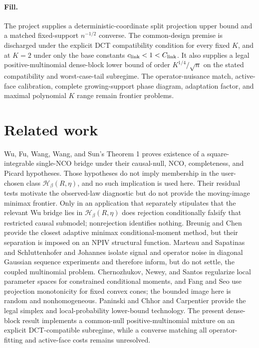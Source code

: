 \documentclass{article}
\begin{document}
\paragraph{Fill.} The project supplies a deterministic-coordinate split projection upper bound and a matched fixed-support \(n^{-1/2}\) converse. The common-design premise is discharged under the explicit DCT compatibility condition for every fixed \(K\), and at \(K=2\) under only the base constants \(c_{\rm link}<1<C_{\rm link}\). It also supplies a legal positive-multinomial dense-block lower bound of order \(K^{1/4}/\sqrt n\) on the stated compatibility and worst-case-tail subregime. The operator-nuisance match, active-face calibration, complete growing-support phase diagram, adaptation factor, and maximal polynomial \(K\) range remain frontier problems.

\section{Related work}

Wu, Fu, Wang, Wang, and Sun's Theorem 1 proves existence of a square-integrable single-NCO bridge under their causal-null, NCO, completeness, and Picard hypotheses. Those hypotheses do not imply membership in the user-chosen class \(\mathcal H_\beta(R,\eta)\), and no such implication is used here. Their residual tests motivate the observed-law diagnostic but do not provide the moving-image minimax frontier. Only in an application that separately stipulates that the relevant Wu bridge lies in \(\mathcal H_\beta(R,\eta)\) does rejection conditionally falsify that restricted causal submodel; nonrejection identifies nothing. Breunig and Chen provide the closest adaptive minimax conditional-moment method, but their separation is imposed on an NPIV structural function. Marteau and Sapatinas and Schluttenhofer and Johannes isolate signal and operator noise in diagonal Gaussian sequence experiments and therefore inform, but do not settle, the coupled multinomial problem. Chernozhukov, Newey, and Santos regularize local parameter spaces for constrained conditional moments, and Fang and Seo use projection monotonicity for fixed convex cones; the bounded image here is random and nonhomogeneous. Paninski and Chhor and Carpentier provide the legal simplex and local-probability lower-bound technology. The present dense-block result implements a common-null positive-multinomial mixture on an explicit DCT-compatible subregime, while a converse matching all operator-fitting and active-face costs remains unresolved.
\end{document}
